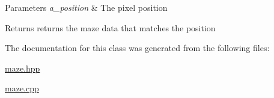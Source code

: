 \begin{DoxyParams}{Parameters}
{\em a\+\_\+position} & The pixel position \\
\hline
\end{DoxyParams}
\begin{DoxyReturn}{Returns}
returns the maze data that matches the position 
\end{DoxyReturn}


The documentation for this class was generated from the following files\+:\begin{DoxyCompactItemize}
\item 
\hyperlink{maze_8hpp}{maze.\+hpp}\item 
\hyperlink{maze_8cpp}{maze.\+cpp}\end{DoxyCompactItemize}
